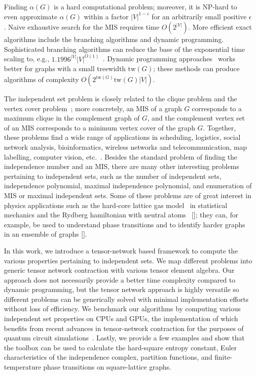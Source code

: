 \documentclass[onefignum, onetabnum]{siamart190516}
\newcommand{\<}{\langle}
\renewcommand{\>}{\rangle}
\newcommand{\red}[1]{[{\bf  \color{red}{ST: #1}}]}
\newcounter{example}
\begin{document}
Finding $\alpha(G)$ is a hard computational problem; moreover, it is NP-hard to even approximate $\alpha(G)$ within a factor $|V|^{1-\epsilon}$ for an arbitrarily small positive $\epsilon$.
Naive exhaustive search for the MIS requires time $O\left(2^{|V|} \right)$. More efficient exact algorithms include the branching algorithms and dynamic programming.
Sophisticated branching algorithms can reduce the base of the exponential time scaling to, e.g., $1.1996^{|V|} {|V|}^{O(1)}$~\cite{Xiao2017}.
Dynamic programming approaches~\cite{Courcelle1990, Fomin2013} works better for graphs with a small treewidth $\text{tw}(G)$;
these methods can produce algorithms of complexity $O(2^{\text{tw}(G)} \text{tw}(G) |V|)$.

The independent set problem is closely related to the clique problem and the vertex cover problem~\cite{Moore2011};
more concretely, an MIS of a graph $G$ corresponds to a maximum clique in the complement graph of $G$,
and the complement vertex set of an MIS corresponds to a minimum vertex cover of the graph $G$.
Together, these problems find a wide range of applications in scheduling, logistics, social network analysis, bioinformatics, wireless networks and telecommunication,
map labelling, computer vision, etc.~\cite{Butenko2003, Wu2015}.
Besides the standard problem of finding the independence number and an MIS, there are many other interesting problems pertaining to independent sets, such as the number of independent sets,
independence polynomial, maximal independence polynomial, and enumeration of MIS or maximal independent sets.
Some of these problems are of great interest in physics applications such as the hard-core lattice gas model~\cite{Dyre2016, Fernandes2007}
in statistical mechanics and the Rydberg hamiltonian with neutral atoms~\cite{Pichler2018} \red{cite experiment when it's ready};
they can, for example, be used to understand phase transitions and to identify harder graphs in an ensemble of graphs \red{cite experiment}.

In this work, we introduce a tensor-network based framework to compute the various properties pertaining to independent sets.
We map different problems into generic tensor network contraction with various tensor element algebra.
Our approach does not necessarily provide a better time complexity compared to dynamic programming,
but the tensor network approach is highly versatile so different problems can be generically solved with minimal implementation efforts without loss of efficiency.
We benchmark our algorithms by computing various independent set properties on CPUs and GPUs, the implementation of which benefits from recent advances in tensor-network contraction for the purposes of quantum circuit simulations~\cite{Gray2021, Pan2021}.
Lastly, we provide a few examples and show that the toolbox can be used to calculate the hard-square entropy constant,
Euler characteristics of the independence complex, partition functions, and finite-temperature phase transitions on square-lattice graphs. 
\end{document}
